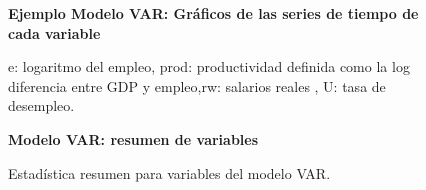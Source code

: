 
	
	
	\begin{figure}[H]
		\centering
		\textbf{Ejemplo Modelo VAR: Gráficos de las series de tiempo de cada variable}\par\medskip
		\caption{e: logaritmo del empleo, prod: productividad definida como la log diferencia entre GDP y empleo,rw: salarios reales , U: tasa de desempleo.}\label{figd15}
	\end{figure}
	
	
	
	\begin{figure}[H]
		\centering
		\textbf{Modelo VAR: resumen de variables}\par\medskip
		\caption{Estadística resumen para variables del modelo VAR.}\label{figd16}
	\end{figure}
	
